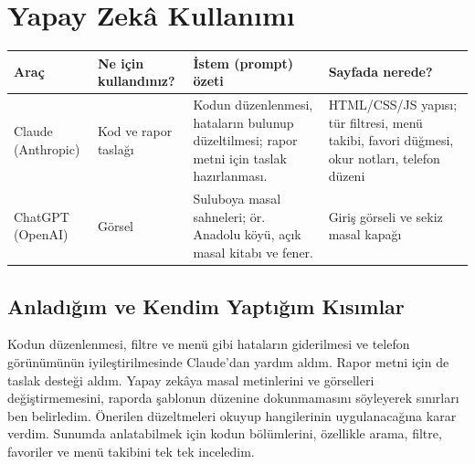 \documentclass[12pt,a4paper]{article}
\begin{document}
\section{Yapay Zekâ Kullanımı}
\begin{longtable}{@{}p{2.6cm}p{3.6cm}p{4.2cm}p{3.4cm}@{}}
\toprule
\textbf{Araç} & \textbf{Ne için kullandınız?} & \textbf{İstem (prompt) özeti} & \textbf{Sayfada nerede?} \\
\midrule
\endhead
\relax Claude (Anthropic) & Kod ve rapor taslağı & Kodun düzenlenmesi, hataların bulunup düzeltilmesi; rapor metni için taslak hazırlanması. & HTML/CSS/JS yapısı; tür filtresi, menü takibi, favori düğmesi, okur notları, telefon düzeni \\
\relax ChatGPT (OpenAI) & Görsel & Suluboya masal sahneleri; ör. Anadolu köyü, açık masal kitabı ve fener. & Giriş görseli ve sekiz masal kapağı \\
\bottomrule
\end{longtable}

\subsection{Anladığım ve Kendim Yaptığım Kısımlar}
Kodun düzenlenmesi, filtre ve menü gibi hataların giderilmesi ve telefon görünümünün iyileştirilmesinde Claude'dan yardım aldım. Rapor metni için de taslak desteği aldım. Yapay zekâya masal metinlerini ve görselleri değiştirmemesini, raporda şablonun düzenine dokunmamasını söyleyerek sınırları ben belirledim. Önerilen düzeltmeleri okuyup hangilerinin uygulanacağına karar verdim. Sunumda anlatabilmek için kodun bölümlerini, özellikle arama, filtre, favoriler ve menü takibini tek tek inceledim.

\end{document}
